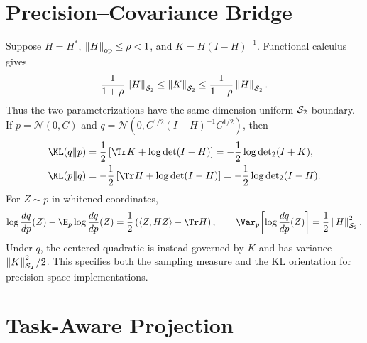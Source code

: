 \section{Precision--Covariance Bridge}
\label{app:precision-bridge}

Suppose $H=H^\ast$, $\left\lVert H \right\rVert_{\mathrm{op}}\le\rho<1$, and
$K=H(I-H)^{-1}$. Functional calculus gives
\begin{equation}
  \frac{1}{1+\rho}\left\lVert H \right\rVert_{\mathcal{S}_{2}}
  \le \left\lVert K \right\rVert_{\mathcal{S}_{2}}
  \le \frac{1}{1-\rho}\left\lVert H \right\rVert_{\mathcal{S}_{2}}.
  \label{eq:precision-covariance-s2-bounds}
\end{equation}
Thus the two parameterizations have the same dimension-uniform
$\mathcal{S}_{2}$ boundary. If
$p=\mathcal N(0,C)$ and
$q=\mathcal N(0,C^{1/2}(I-H)^{-1}C^{1/2})$, then
\begin{align}
  \KL(q\Vert p)
  &=\frac12\left[\Tr K+\log\det(I-H)\right]
    =-\frac12\log\det\nolimits_2(I+K), \\
  \KL(p\Vert q)
  &=-\frac12\left[\Tr H+\log\det(I-H)\right]
    =-\frac12\log\det\nolimits_2(I-H).
  \label{eq:precision-two-kl-directions}
\end{align}
For $Z\sim p$ in whitened coordinates,
\begin{equation}
  \log\frac{dq}{dp}(Z)-\E_p\log\frac{dq}{dp}(Z)
  =\frac12\left(\langle Z,HZ\rangle-\Tr H\right),
  \qquad
  \Var_p\!\left[\log\frac{dq}{dp}(Z)\right]
  =\frac12\hsnorm{H}^2.
\end{equation}
Under $q$, the centered quadratic is instead governed by $K$ and has variance
$\left\lVert K \right\rVert_{\mathcal{S}_{2}}^2/2$. This specifies both the sampling measure and the KL
orientation for precision-space implementations.


\section{Task-Aware Projection}
\label{app:task-aware-kkt}

